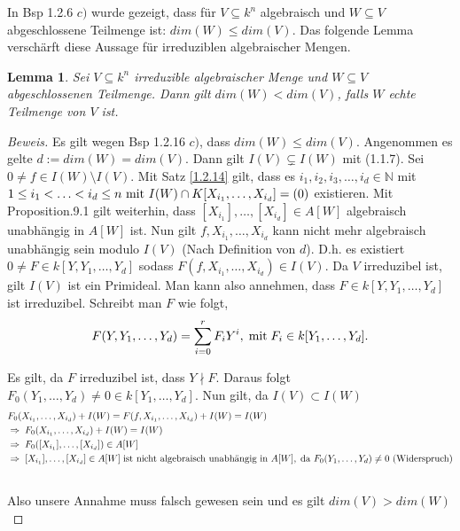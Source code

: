 \documentclass{article}
\newtheorem{lemma}[satz]{Lemma}
\newcommand*{\indx}[2]{{#1}_{#2}}
\newcommand*{\potx}[2]{{#1}^{#2}}
\newcommand*{\dkette}[2]{${#1}_1,{#1}_2,{#1}_3,\ldots,{#1}_{#2} \in \mathbb{N}$}
\begin{document}
In Bsp 1.2.6 $c)$ wurde gezeigt, dass für $V\subseteq k^n$ algebraisch und $W\subseteq V$ abgeschlossene Teilmenge ist: $dim(W)\leq dim(V)$. Das folgende Lemma verschärft diese Aussage für irreduziblen algebraischer Mengen.

\begin{lemma}
	Sei $V\subseteq k^n$ irreduzible algebraischer Menge und $W\subseteq V$ abgeschlossenen Teilmenge. Dann gilt $dim(W)<dim(V)$, falls $W$ echte Teilmenge von $V$ ist.
\end{lemma} 

\begin{proof}[Beweis]
	Es gilt wegen Bsp 1.2.16 $c)$, dass $dim(W)\leq dim(V)$. Angenommen es gelte $d:=dim(W)=dim(V)$. Dann gilt $I(V)\subsetneq I(W)$ mit (1.1.7). Sei $0\neq f\in I(W)\setminus I(V)$. Mit Satz \ref{1.2.14} gilt, dass es \dkette{i}{d} mit $ 1\leq\indx{i}{1}<\ldots<\indx{i}{d}\leq n \textnormal{ mit } I(W)\cap K[\indx{X}{\indx{i}{1}},\ldots,\indx{X}{\indx{i}{d}}]=(0)$ existieren. Mit Proposition.9.1 gilt weiterhin, dass $[\indx{X}{\indx{i}{1}}],\ldots,[\indx{X}{\indx{i}{d}}] \in A[W]$ algebraisch unabhängig in $A[W]$ ist. Nun gilt $f,\indx{X}{\indx{i}{1}},\ldots,\indx{X}{\indx{i}{d}}$ kann nicht mehr algebraisch unabhängig sein  modulo $I(V)$ (Nach Definition von $d$).
	D.h. es existiert $0\neq F\in k[Y,\indx{Y}{1},\ldots,\indx{Y}{d}]$ sodass $F(f,\indx{X}{\indx{i}{1}},\ldots,\indx{X}{\indx{i}{d}})\in I(V)$. Da $V$ irreduzibel ist, gilt $I(V)$ ist ein Primideal. Man kann also annehmen, dass $F\in k[Y,\indx{Y}{1},\ldots,\indx{Y}{d}]$ ist irreduzibel.
	Schreibt man $F$ wie folgt, 
	\begin{displaymath}
	F(Y,\indx{Y}{1},\ldots,\indx{Y}{d})=\sum_{i=0}^{r}\indx{F}{i}\potx{Y}{i},\; \textnormal{mit}\;  \indx{F}{i}\in k[\indx{Y}{1},\ldots,\indx{Y}{d}].
	\end{displaymath}
	
	Es gilt, da $F$ irreduzibel ist, dass $Y\nmid F$. Daraus folgt $\indx{F}{0}(\indx{Y}{1},\ldots,\indx{Y}{d})\neq0 \in k[\indx{Y}{1},\ldots,\indx{Y}{d}]$. Nun gilt, da $I(V)\subset I(W)$ 
	\begin{align*}
	&\indx{F}{0}(\indx{X}{\indx{i}{1}},\ldots,\indx{X}{\indx{i}{d}})+I(W)=F(f,\indx{X}{\indx{i}{1}},\ldots,\indx{X}{\indx{i}{d}})+I(W)=I(W)\\&
	\Rightarrow \; \indx{F}{0}(\indx{X}{\indx{i}{1}},\ldots,\indx{X}{\indx{i}{d}})+I(W)=I(W)\\&
	\Rightarrow \; \indx{F}{0}([\indx{X}{\indx{i}{1}}],\ldots,[\indx{X}{\indx{i}{d}}]) \in A[W]\\&
	\Rightarrow\; [\indx{X}{\indx{i}{1}}],\ldots,[\indx{X}{\indx{i}{d}}]\in A[W]\; \textnormal{ist nicht algebraisch unabhängig in }A[W],\;\textnormal{da $\indx{F}{0}(\indx{Y}{1},\ldots,\indx{Y}{d})\neq0$ (Widerspruch)}\\& 
	\end{align*}
	
	Also unsere Annahme muss falsch gewesen sein und es gilt $dim(V)>dim(W)$
\end{proof}
\end{document}
